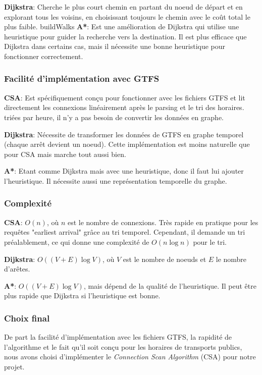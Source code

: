 \documentclass[12pt]{article}
\begin{document}
\textbf{Dijkstra}: Cherche le plus court chemin en partant du noeud de départ et en explorant tous les voisins, en choisissant toujours le chemin avec 
le coût total le plus faible.
buildWalks
\textbf{A*}: Est une amélioration de Dijkstra qui utilise une heuristique pour guider la recherche vers la destination. Il est plus efficace que Dijkstra dans certains cas,
mais il nécessite une bonne heuristique pour fonctionner correctement.

\subsubsection{Facilité d'implémentation avec GTFS}
\textbf{CSA}: Est spécifiquement conçu pour fonctionner avec les fichiers GTFS et lit directement les connexions linéairement après le parsing et le tri des horaires.
triées par heure, il n'y a pas besoin de convertir les données en graphe.

\textbf{Dijkstra}: Nécessite de transformer les données de GTFS en graphe temporel (chaque arrêt devient un noeud).
Cette implémentation est moins naturelle que pour CSA mais marche tout aussi bien.

\textbf{A*}: Etant comme Dijkstra mais avec une heuristique, donc il faut lui ajouter l'heuristique. 
Il nécessite aussi une représentation temporelle du graphe.

\subsubsection{Complexité}
\textbf{CSA}: $O(n)$, où $n$ est le nombre de connexions. Très rapide en pratique pour les requêtes "earliest arrival" grâce au tri temporel. 
Cependant, il demande un tri préalablement, ce qui donne une complexité de $O(n \log n)$ pour le tri.

\textbf{Dijkstra}: $O((V + E) \log V)$, où $V$ est le nombre de noeuds et $E$ le nombre d'arêtes.

\textbf{A*}: $O((V + E) \log V)$, mais dépend de la qualité de l'heuristique. Il peut être plus rapide que Dijkstra si l'heuristique est bonne.

\subsubsection{Choix final}
De part la facilité d'implémentation avec les fichiers GTFS, la rapidité de l'algorithme et le fait qu'il soit conçu pour les horaires de transports publics,
nous avons choisi d'implémenter le \emph{Connection Scan Algorithm} (CSA) pour notre projet.
\end{document}
